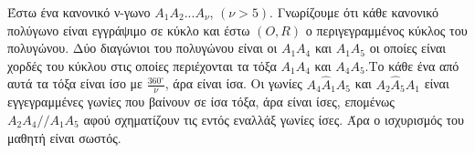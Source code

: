 \begin{alist}
    \item 
    \begin{figure}
        \centering
    \end{figure}
    Έστω ένα κανονικό ν-γωνο $A_1A_2...A_ν$, $(ν>5)$. Γνωρίζουμε ότι κάθε κανονικό πολύγωνο είναι εγγράψιμο σε κύκλο και έστω $(O,R)$ ο περιγεγραμμένος κύκλος του πολυγώνου. Δύο διαγώνιοι του πολυγώνου είναι οι $A_1A_4$ και $A_1A_5$ οι οποίες είναι χορδές του κύκλου στις οποίες περιέχονται τα τόξα $A_1A_4$ και $A_4A_5$.Το κάθε ένα από αυτά τα τόξα είναι ίσο με $\frac{360^\circ}{ν}$, άρα είναι ίσα. Οι γωνίες $A_4\widehat{A}_1A_5$ και $A_2\widehat{A}_5A_1$ είναι εγγεγραμμένες γωνίες που βαίνουν σε ίσα τόξα, άρα είναι ίσες, επομένως $A_2A_4//A_1A_5$ αφού σχηματίζουν τις εντός εναλλάξ γωνίες ίσες. Άρα ο ισχυρισμός του μαθητή είναι σωστός.
\end{alist}